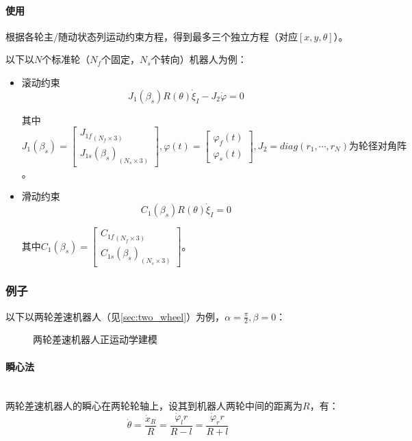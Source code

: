 \documentclass[
12pt, %
a4paper, 
oneside, %
headinclude,footinclude, %
]{scrartcl}
\begin{document}
\paragraph{使用}
根据各轮主/随动状态列运动约束方程，得到最多三个独立方程（对应$ [x, y ,\theta] $）。

以下以$ N $个标准轮（$ N_f $个固定，$ N_s $个转向）机器人为例：
\begin{itemize}
\item 滚动约束
$$ J_1(\beta_s) R(\theta) \dot{\xi}_I - J_2 \dot{\varphi} = 0 $$

其中$ J_1(\beta_s) =  \begin{bmatrix} {J_{1f}}_{(N_f \times 3)} \\ {J_{1s}(\beta_s)}_{(N_s \times 3)} \end{bmatrix}, \varphi(t) = \begin{bmatrix} \varphi_f(t) \\ \varphi_s(t) \end{bmatrix}, J_2 = diag(r_1, \cdots, r_N)\text{为轮径对角阵} $。
\item 滑动约束
$$ C_1(\beta_s) R(\theta) \dot{\xi}_I = 0 $$

其中$ C_1(\beta_s) = \begin{bmatrix} {C_{1f}}_{(N_f \times 3)} \\ {C_{1s}(\beta_s)}_{(N_s \times 3)} \end{bmatrix} $。
\end{itemize}
\subsubsection[例子]{例子}\label{sec:example1}
以下以两轮差速机器人（见\ref{sec:two_wheel}）为例，$ \alpha = \frac{\pi}{2}, \beta = 0 $：
\begin{figure}[H]
\centering
{} \quad
{}
\caption{两轮差速机器人正运动学建模}
\end{figure}
\paragraph{瞬心法}~\\

两轮差速机器人的瞬心在两轮轮轴上，设其到机器人两轮中间的距离为$ R $，有：
$$ \dot{\theta} = \frac{\dot{x}_R}{R} = \frac{\dot{\varphi}_l r}{R - l} = \frac{\dot{\varphi}_r r}{R + l} $$
\end{document}
